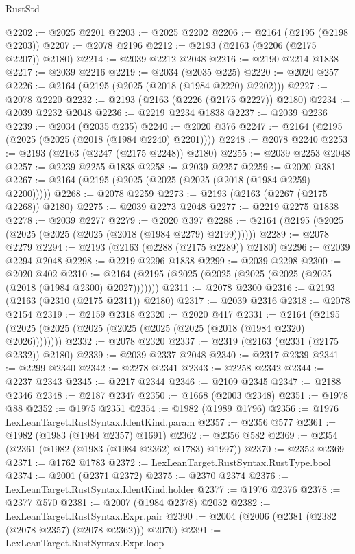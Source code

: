 \begin{lexlean}{RustStd}
\begin{coremodule}
@2202 := @2025 @2201
@2203 := @2025 @2202
@2206 := @2164 (@2195 (@2198 @2203))
@2207 := @2078 @2196
@2212 := @2193 (@2163 (@2206 (@2175 @2207)) @2180)
@2214 := @2039 @2212 @2048
@2216 := @2190 @2214 @1838
@2217 := @2039 @2216
@2219 := @2034 (@2035 @225)
@2220 := @2020 @257
@2226 := @2164 (@2195 (@2025 (@2018 (@1984 @2220) @2202)))
@2227 := @2078 @2220
@2232 := @2193 (@2163 (@2226 (@2175 @2227)) @2180)
@2234 := @2039 @2232 @2048
@2236 := @2219 @2234 @1838
@2237 := @2039 @2236
@2239 := @2034 (@2035 @235)
@2240 := @2020 @376
@2247 := @2164 (@2195 (@2025 (@2025 (@2018 (@1984 @2240) @2201))))
@2248 := @2078 @2240
@2253 := @2193 (@2163 (@2247 (@2175 @2248)) @2180)
@2255 := @2039 @2253 @2048
@2257 := @2239 @2255 @1838
@2258 := @2039 @2257
@2259 := @2020 @381
@2267 := @2164 (@2195 (@2025 (@2025 (@2025 (@2018 (@1984 @2259) @2200)))))
@2268 := @2078 @2259
@2273 := @2193 (@2163 (@2267 (@2175 @2268)) @2180)
@2275 := @2039 @2273 @2048
@2277 := @2219 @2275 @1838
@2278 := @2039 @2277
@2279 := @2020 @397
@2288 := @2164 (@2195 (@2025 (@2025 (@2025 (@2025 (@2018 (@1984 @2279) @2199))))))
@2289 := @2078 @2279
@2294 := @2193 (@2163 (@2288 (@2175 @2289)) @2180)
@2296 := @2039 @2294 @2048
@2298 := @2219 @2296 @1838
@2299 := @2039 @2298
@2300 := @2020 @402
@2310 := @2164 (@2195 (@2025 (@2025 (@2025 (@2025 (@2025 (@2018 (@1984 @2300) @2027)))))))
@2311 := @2078 @2300
@2316 := @2193 (@2163 (@2310 (@2175 @2311)) @2180)
@2317 := @2039 @2316
@2318 := @2078 @2154
@2319 := @2159 @2318
@2320 := @2020 @417
@2331 := @2164 (@2195 (@2025 (@2025 (@2025 (@2025 (@2025 (@2025 (@2018 (@1984 @2320) @2026))))))))
@2332 := @2078 @2320
@2337 := @2319 (@2163 (@2331 (@2175 @2332)) @2180)
@2339 := @2039 @2337 @2048
@2340 := @2317 @2339
@2341 := @2299 @2340
@2342 := @2278 @2341
@2343 := @2258 @2342
@2344 := @2237 @2343
@2345 := @2217 @2344
@2346 := @2109 @2345
@2347 := @2188 @2346
@2348 := @2187 @2347
@2350 := @1668 (@2003 @2348)
@2351 := @1978 @88
@2352 := @1975 @2351
@2354 := @1982 (@1989 @1796)
@2356 := @1976 LexLeanTarget.RustSyntax.IdentKind.param
@2357 := @2356 @577
@2361 := @1982 (@1983 (@1984 @2357) @1691)
@2362 := @2356 @582
@2369 := @2354 (@2361 (@1982 (@1983 (@1984 @2362) @1783) @1997))
@2370 := @2352 @2369
@2371 := @1762 @1783
@2372 := LexLeanTarget.RustSyntax.RustType.bool
@2374 := @2001 (@2371 @2372)
@2375 := @2370 @2374
@2376 := LexLeanTarget.RustSyntax.IdentKind.holder
@2377 := @1976 @2376
@2378 := @2377 @570
@2381 := @2007 (@1984 @2378) @2032
@2382 := LexLeanTarget.RustSyntax.Expr.pair
@2390 := @2004 (@2006 (@2381 (@2382 (@2078 @2357) (@2078 @2362))) @2070)
@2391 := LexLeanTarget.RustSyntax.Expr.loop

\end{coremodule}
\end{lexlean}
